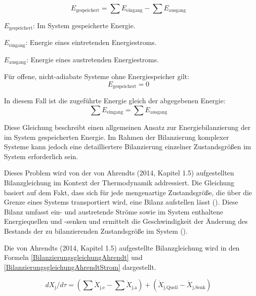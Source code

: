 \begin{equation}
E_{\text{gespeichert}} = \sum E_{\text{eingang}} - \sum E_{\text{ausgang}}
\label{energiebilanzierungsgleichung_Rönsch}
\end{equation}

\begin{description}
    \item \(E_{\text{gespeichert}}\): Im System gespeicherte Energie.
    \item \(E_{\text{eingang}}\): Energie eines eintretenden Energiestroms.
    \item \(E_{\text{ausgang}}\): Energie eines austretenden Energiestroms.
    \item Für offene, nicht-adiabate Systeme ohne Energiespeicher gilt:
    \[
    E_{\text{gespeichert}} = 0
    \]
    \item In diesem Fall ist die zugeführte Energie gleich der abgegebenen Energie:
    \[
    \sum E_{\text{eingang}} = \sum E_{\text{ausgang}}
    \]
\end{description}

Diese Gleichung beschreibt einen allgemeinen Ansatz zur Energiebilanzierung der im System gespeicherten Energie. 
Im Rahmen der Bilanzierung komplexer Systeme kann jedoch eine detailliertere Bilanzierung einzelner Zustandsgrößen im System erforderlich sein.

Dieses Problem wird von der von Ahrendts (2014, Kapitel 1.5) aufgestellten Bilanzgleichung im Kontext der Thermodynamik addressiert. 
Die Gleichung basiert auf dem Fakt, dass sich für jede mengenartige Zustandsgröße, die über die Grenze eines Systems transportiert wird, eine 
Bilanz aufstellen lässt (\cite[Kapitel 1.5]{Ahrendts.2014}). 
Diese Bilanz umfasst ein- und austretende Ströme sowie im System enthaltene Energiequellen und -senken und ermittelt die 
Geschwindigkeit der Änderung des Bestands der zu bilanzierenden Zustandsgröße im System (\cite[Kapitel 1.5]{Ahrendts.2014}).

Die von Ahrendts (2014, Kapitel 1.5) aufgestellte Bilanzgleichung wird in den Formeln \eqref{BilanzierungsgleichungAhrendt} und 
\eqref{BilanzierungsgleichungAhrendtStrom} dargestellt.

\begin{equation}
    dX_{\text{j}}/d\tau = (\sum \dot{X}_{\text{j,e}} - \sum \dot{X}_{\text{j,a}}) + (\dot{X}_{\text{j,Quell}} - \dot{X}_{\text{j,Senk}})
    \label{BilanzierungsgleichungAhrendt}
\end{equation}

